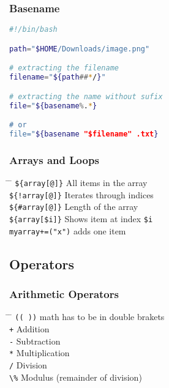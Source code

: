 \documentclass[a4paper,10pt]{article}
\begin{document}
\subsubsection{Basename}
\begin{lstlisting}[language=bash]
#!/bin/bash 

path="$HOME/Downloads/image.png"

# extracting the filename 
filename="${path##*/}" 

# extracting the name without sufix 
file="${basename%.*} 

# or 
file="${basename "$filename" .txt}
\end{lstlisting}

\subsubsection*{Arrays and Loops}
\begin{tabbing}
	\= \hspace{30mm} \= \hspace{50mm} \kill
	\> \verb|${array[@]}| \> All items in the array \\
	\> \verb|${!array[@]}| \> Iterates through indices \\
	\> \verb|${#array[@]}| \> Length of the array \\
	\> \verb|${array[$i]}| \> Shows item at index \verb|$i| \\
	\> \verb|myarray+=("x")| \> adds one item \\
\end{tabbing}

\subsection{Operators}
\subsubsection*{Arithmetic Operators}
\begin{tabbing}
	\= \hspace{30mm} \= \hspace{50mm} \kill
	\> \verb|(( ))| \> math has to be in double brakets \\
	\> \verb|+| \> Addition \\
	\> \verb|-| \> Subtraction \\
	\> \verb|*| \> Multiplication \\
	\> \verb|/| \> Division \\
	\> \verb|\%| \> Modulus (remainder of division) \\
\end{tabbing}
\end{document}
